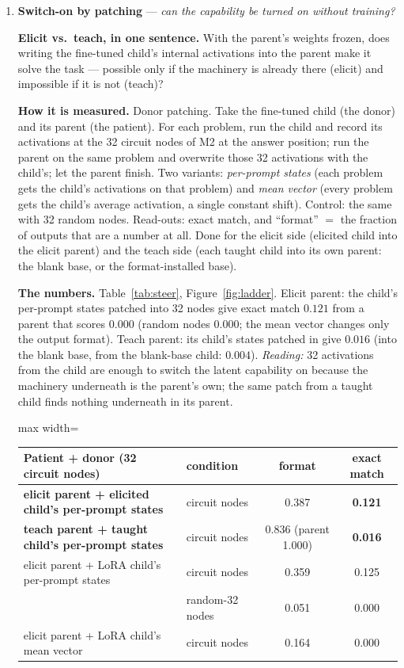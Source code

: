\documentclass[11pt]{article}
\newcommand{\what}[1]{\par\noindent\textbf{Elicit vs.\ teach, in one sentence.} #1}
\newcommand{\how}[1]{\par\noindent\textbf{How it is measured.} #1}
\newcommand{\numbers}[1]{\par\noindent\textbf{The numbers.} #1\par\medskip}
\newcommand{\metricsec}[2]{\item \textbf{#1} --- \emph{#2}}
\begin{document}
\begin{enumerate}[label=\textbf{M\arabic*}, leftmargin=*, itemsep=1.2em, resume]
\metricsec{Switch-on by patching}{can the capability be turned on without training?}
\what{With the parent's weights frozen, does writing the fine-tuned child's internal activations
into the parent make it solve the task --- possible only if the machinery is already there
(elicit) and impossible if it is not (teach)?}
\how{Donor patching. Take the fine-tuned child (the donor) and its parent (the patient). For each
problem, run the child and record its activations at the 32 circuit nodes of M2 at the answer
position; run the parent on the same problem and overwrite those 32 activations with the child's;
let the parent finish. Two variants: \emph{per-prompt states} (each problem gets the child's
activations on that problem) and \emph{mean vector} (every problem gets the child's average
activation, a single constant shift). Control: the same with 32 random nodes. Read-outs: exact
match, and ``format'' $=$ the fraction of outputs that are a number at all. Done for the elicit
side (elicited child into the elicit parent) and the teach side (each taught child into its own
parent: the blank base, or the format-installed base).}
\numbers{Table~\ref{tab:steer}, Figure~\ref{fig:ladder}. Elicit parent: the child's per-prompt
states patched into 32 nodes give exact match $0.121$ from a parent that scores $0.000$ (random
nodes $0.000$; the mean vector changes only the output format). Teach parent: its child's states
patched in give $0.016$ (into the blank base, from the blank-base child: $0.004$).
\emph{Reading:} 32 activations from the child are enough to switch the latent capability on
because the machinery underneath is the parent's own; the same patch from a taught child finds
nothing underneath in its parent.}
\begin{table}[h]\centering\small
\begin{adjustbox}{max width=\textwidth}
\begin{tabular}{llcc}
\toprule
Patient + donor (32 circuit nodes) & condition & format & exact match \\
\midrule
\textbf{elicit parent + elicited child's per-prompt states} & circuit nodes & 0.387 & \textbf{0.121} \\
\textbf{teach parent + taught child's per-prompt states} & circuit nodes & 0.836 (parent 1.000) & \textbf{0.016} \\
\midrule
elicit parent + LoRA child's per-prompt states & circuit nodes & 0.359 & 0.125 \\
 & random-32 nodes & 0.051 & 0.000 \\
elicit parent + LoRA child's mean vector & circuit nodes & 0.164 & 0.000 \\

\end{tabular}
\end{adjustbox}
\end{table}
\end{enumerate}
\end{document}
